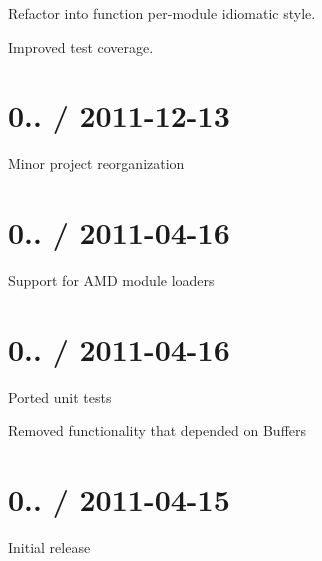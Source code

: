 
\begin{DoxyItemize}
\item Refactor into function per-\/module idiomatic style.
\item Improved test coverage.
\end{DoxyItemize}

\section*{0.. / 2011-\/12-\/13}


\begin{DoxyItemize}
\item Minor project reorganization
\end{DoxyItemize}

\section*{0.. / 2011-\/04-\/16}


\begin{DoxyItemize}
\item Support for A\+MD module loaders
\end{DoxyItemize}

\section*{0.. / 2011-\/04-\/16}


\begin{DoxyItemize}
\item Ported unit tests
\item Removed functionality that depended on Buffers
\end{DoxyItemize}

\section*{0.. / 2011-\/04-\/15}


\begin{DoxyItemize}
\item Initial release 
\end{DoxyItemize}